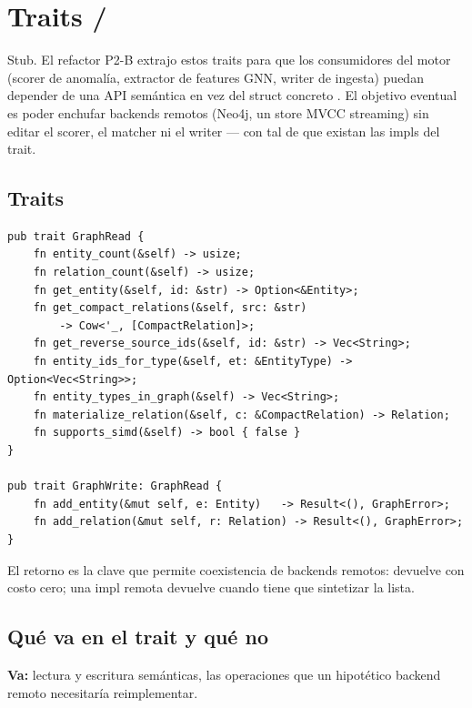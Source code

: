 \chapter{Traits  / }
\label{ch:graph-traits}

\begin{note}
Stub. El refactor P2-B extrajo estos traits para que los
consumidores del motor (scorer de anomalía, extractor de
features GNN, writer de ingesta) puedan depender de una API
semántica en vez del struct concreto . El
objetivo eventual es poder enchufar backends remotos (Neo4j, un
store MVCC streaming) sin editar el scorer, el matcher ni el
writer --- con tal de que existan las impls del trait.
\end{note}

\section{Traits}

\begin{lstlisting}[style=rust]
pub trait GraphRead {
    fn entity_count(&self) -> usize;
    fn relation_count(&self) -> usize;
    fn get_entity(&self, id: &str) -> Option<&Entity>;
    fn get_compact_relations(&self, src: &str)
        -> Cow<'_, [CompactRelation]>;
    fn get_reverse_source_ids(&self, id: &str) -> Vec<String>;
    fn entity_ids_for_type(&self, et: &EntityType) -> Option<Vec<String>>;
    fn entity_types_in_graph(&self) -> Vec<String>;
    fn materialize_relation(&self, c: &CompactRelation) -> Relation;
    fn supports_simd(&self) -> bool { false }
}

pub trait GraphWrite: GraphRead {
    fn add_entity(&mut self, e: Entity)   -> Result<(), GraphError>;
    fn add_relation(&mut self, r: Relation) -> Result<(), GraphError>;
}
\end{lstlisting}

El retorno  es la clave que
permite coexistencia de backends remotos:
 devuelve  con
costo cero; una impl remota devuelve 
cuando tiene que sintetizar la lista.

\section{Qué va en el trait y qué no}

\textbf{Va:} lectura y escritura semánticas, las operaciones que
un hipotético backend remoto necesitaría reimplementar.

